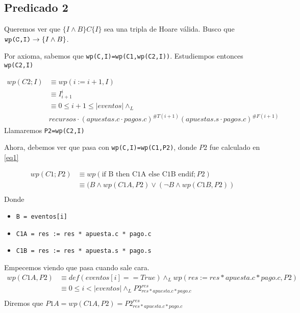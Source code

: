 \documentclass[../document.tex]{subfiles}
\begin{document}
\subsection*{Predicado 2}
Queremos ver que $\{I \land B\}C\{I\}$ sea una tripla de Hoare válida. Busco que $\verb+wp(C,I)+ \to \{I \land B\}$.

Por axioma, sabemos que \verb+wp(C,I)=wp(C1,wp(C2,I))+. Estudiempos entonces \verb|wp(C2,I)|

\begin{equation} \label{eq1}
\begin{split}
wp(C2;I) & \equiv wp(i := i+1,I) \\
         & \equiv I^{i}_{i+1} \\
         & \equiv 0\leq i+1 \leq |eventos| \land_L\\ 
         &recursos \cdot (apuestas.c\cdot pagos.c)^{\#T(i+1)}(apuestas.s\cdot pagos.c)^{\#F(i+1)}
\end{split}
\end{equation}
Llamaremos \verb|P2=wp(C2,I)|

Ahora, debemos ver que pasa con \verb+wp(C,I)=wp(C1,P2)+, donde $P2$ fue calculado en \ref{eq1}

\begin{equation} \label{eq2}
\begin{split}
wp(C1;P2) & \equiv wp(\text{if B then C1A else C1B endif};P2) \\
          & \equiv (B \land wp(C1A, P2) \lor (\neg B \land wp(C1B, P2)) \\
\end{split}
\end{equation}
Donde
\begin{itemize}
    \item \verb|B = eventos[i]|
    \item \verb|C1A = res := res * apuesta.c * pago.c|
    \item \verb|C1B = res := res * apuesta.s * pago.s|
\end{itemize}

Empecemos viendo que pasa cuando sale cara.
\begin{equation} \label{eq2.a}
\begin{split}
wp(C1A,P2) & \equiv def(eventos[i]==True) \land_{L} wp(res := res * apuesta.c * pago.c, P2) \\
           & \equiv 0\leq i<|eventos| \land_{L} P2^{res}_{res * apuesta.c * pago.c} \\
\end{split}
\end{equation}
Diremos que $P1A = wp(C1A,P2) = P2^{res}_{res * apuesta.c * pago.c}$
\end{document}
